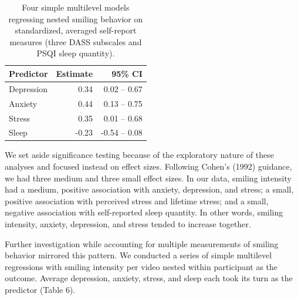 \documentclass[authordate, empirical,issue]{jote-new-article}
\begin{document}
\begin{table}[b!]
  \begin{fullwidth}
    \caption{Four simple multilevel models regressing nested smiling behavior on standardized, averaged self-report measures (three DASS subscales and PSQI sleep quantity).}
    \begin{tabularx}{\linewidth}{@{} X r r  @{}}
      \toprule
      \textbf{Predictor} & \textbf{Estimate} & \textbf{95\% CI} \\
      \bottomrule

      Depression         & 0.34              & 0.02 – 0.67      \\

      Anxiety            & 0.44              & 0.13 – 0.75      \\

      Stress             & 0.35              & 0.01 – 0.68      \\


      Sleep              & -0.23             & -0.54 – 0.08     \\
      \bottomrule
    \end{tabularx}
  \end{fullwidth}
\end{table}



We set aside significance testing because of the exploratory nature of these analyses and focused instead on effect sizes. Following Cohen's (1992) guidance, we had three medium and three small effect sizes. In our data, smiling intensity had a medium, positive association with anxiety, depression, and stress; a small, positive association with perceived stress and lifetime stress; and a small, negative association with self-reported sleep quantity. In other words, smiling intensity, anxiety, depression, and stress tended to increase together.



Further investigation while accounting for multiple measurements of smiling behavior mirrored this pattern. We conducted a series of simple multilevel regressions with smiling intensity per video nested within participant as the outcome. Average depression, anxiety, stress, and sleep each took its turn as the predictor (Table 6).
\end{document}
